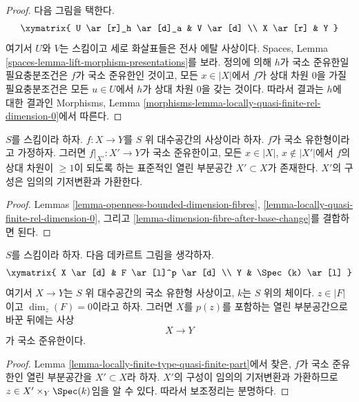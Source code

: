 \begin{proof}
다음 그림을 택한다.
$$
\xymatrix{
U \ar[r]_h \ar[d]_a & V \ar[d] \\
X \ar[r] & Y
}
$$
여기서 $U$와 $V$는 스킴이고 세로 화살표들은 전사 에탈 사상이다.
Spaces, Lemma \ref{spaces-lemma-lift-morphism-presentations}를 보라.
정의에 의해 $h$가 국소 준유한일 필요충분조건은 $f$가 국소
준유한인 것이고, 모든 $x \in |X|$에서 $f$가 상대 차원 $0$을
가질 필요충분조건은 모든 $u \in U$에서 $h$가 상대 차원 $0$을
갖는 것이다. 따라서 결과는 $h$에 대한 결과인 Morphisms, Lemma
\ref{morphisms-lemma-locally-quasi-finite-rel-dimension-0}에서 따른다.
\end{proof}

\begin{lemma}
\label{lemma-locally-finite-type-quasi-finite-part}
$S$를 스킴이라 하자.
$f : X \to Y$를 $S$ 위 대수공간의 사상이라 하자.
$f$가 국소 유한형이라고 가정하자. 그러면 $f|_{X'} : X' \to Y$가
국소 준유한이고, 모든 $x \in |X|$, $x \not \in |X'|$에서
$f$의 상대 차원이 $\geq 1$이 되도록 하는 표준적인 열린 부분공간
$X' \subset X$가 존재한다. $X'$의 구성은 임의의 기저변환과 가환한다.
\end{lemma}

\begin{proof}
Lemmas \ref{lemma-openness-bounded-dimension-fibres},
\ref{lemma-locally-quasi-finite-rel-dimension-0}, 그리고
\ref{lemma-dimension-fibre-after-base-change}를 결합하면 된다.
\end{proof}

\begin{lemma}
\label{lemma-quasi-finite-at-point}
$S$를 스킴이라 하자. 다음 데카르트 그림을 생각하자.
$$
\xymatrix{
X \ar[d] & F \ar[l]^p \ar[d] \\
Y & \Spec(k) \ar[l]
}
$$
여기서 $X \to Y$는 $S$ 위 대수공간의 국소 유한형 사상이고,
$k$는 $S$ 위의 체이다. $z \in |F|$이고 $\dim_z(F) = 0$이라고 하자.
그러면 $X$를 $p(z)$를 포함하는 열린 부분공간으로 바꾼 뒤에는 사상
$$
X \longrightarrow Y
$$
가 국소 준유한이다.
\end{lemma}

\begin{proof}
Lemma \ref{lemma-locally-finite-type-quasi-finite-part}에서 찾은,
$f$가 국소 준유한인 열린 부분공간을 $X' \subset X$라 하자.
$X'$의 구성이 임의의 기저변환과 가환하므로
$z \in X' \times_Y \Spec(k)$임을 알 수 있다. 따라서 보조정리는
분명하다.
\end{proof}






